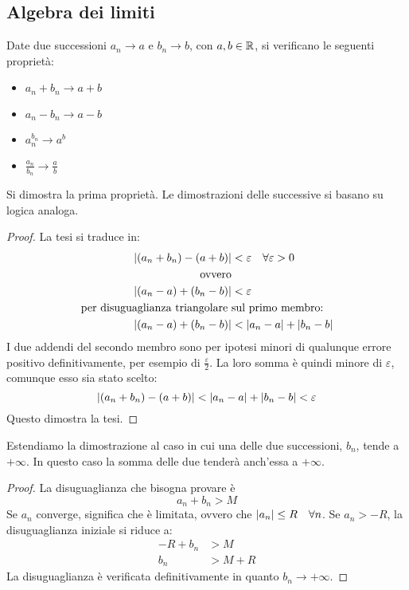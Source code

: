 \subsection{Algebra dei limiti}
\label{alglim}
Date due successioni $a_n\to a$ e $b_n\to b$, con $a,b\in\mathbb{R}$, si verificano le seguenti proprietà:
\begin{itemize}
	\item $a_n+b_n\to a+b$
	\item $a_n-b_n\to a-b$
	\item $a_n^{b_n}\to a^b$
	\item $\frac{a_n}{b_n}\to \frac{a}{b}$
\end{itemize}
Si dimostra la prima proprietà. Le dimostrazioni delle successive si basano su logica analoga.
\begin{proof}
	La tesi si traduce in:
	\begin{align*}
		\left\lvert (a_n+b_n)-(a+b) \right\rvert                  & <\varepsilon \quad \forall\varepsilon>0 \\
		\text{ovvero}                                                                    \\
		\left\lvert (a_n-a)+(b_n-b) \right\rvert                  & <\varepsilon                            \\
		\text{per disuguaglianza triangolare } & \text{sul primo membro:}                \\
		\left\lvert (a_n-a)+(b_n-b) \right\rvert                  & < \left\lvert a_n-a \right\rvert+\left\lvert b_n-b \right\rvert
	\end{align*}
	I due addendi del secondo membro sono per ipotesi minori di qualunque errore positivo definitivamente, per esempio di $\frac{\varepsilon}{2}$. La loro somma è quindi minore di $\varepsilon$, comunque esso sia stato scelto:
	\[
		\left\lvert (a_n+b_n)-(a+b) \right\rvert<\left\lvert a_n-a \right\rvert+\left\lvert b_n-b \right\rvert<\varepsilon
	\]
	Questo dimostra la tesi.
\end{proof}
Estendiamo la dimostrazione al caso in cui una delle due successioni, $b_n$, tende a $+\infty$. In questo caso la somma delle due tenderà anch'essa a $+\infty$.
\begin{proof}
	La disuguaglianza che bisogna provare è
	\[
		a_n+b_n>M
	\]
	Se $a_n$ converge, significa che è limitata, ovvero che $\left\lvert a_n \right\rvert\leq R\quad\forall n$. Se $a_n>-R$, la disuguaglianza iniziale si riduce a:
	\begin{align*}
		-R+b_n & >M   \\
		b_n    & >M+R
	\end{align*}
	La disuguaglianza è verificata definitivamente in quanto $b_n\to+\infty$.
\end{proof}

